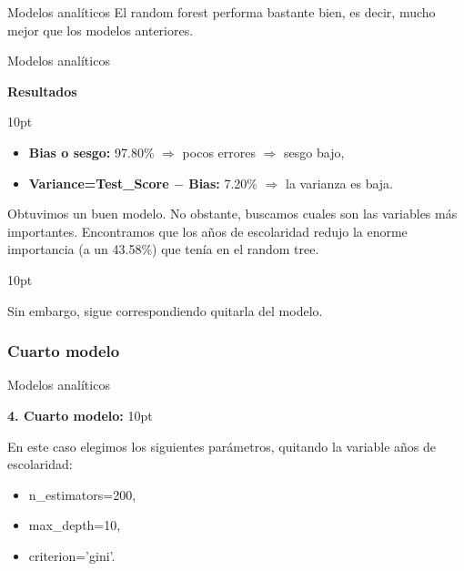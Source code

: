 \documentclass[pdf]{beamer}
\def\vspace{}%
\begin{document}
{\begin{frame}{Modelos analíticos}
    El random forest performa bastante bien, es decir, mucho mejor que los modelos anteriores.

\end{frame}

\begin{frame}{Modelos analíticos}

    \begin{Large}
        \textbf{Resultados}
    \end{Large}
    \vspace{10pt}    
    
    \begin{itemize}
        \item \textbf{Bias o sesgo:} 97.80\% $\Rightarrow$ pocos errores $\Rightarrow$ sesgo bajo,
        \item \textbf{Variance=Test\_Score $-$ Bias:} 7.20\% $\Rightarrow$ la varianza es baja.
    \end{itemize}
    
    Obtuvimos un buen modelo. No obstante, buscamos cuales son las variables más importantes. Encontramos que los años de escolaridad redujo la enorme importancia (a un 43.58\%) que tenía en el random tree. 
    
    \vspace{10pt}
    
    Sin embargo, sigue correspondiendo quitarla del modelo.

\end{frame}

\subsubsection{Cuarto modelo}

\begin{frame}{Modelos analíticos}

    \textbf{4. Cuarto modelo:}
    \vspace{10pt}

    En este caso elegimos los siguientes parámetros, quitando la variable años de escolaridad:
    \begin{itemize}
        \item n\_estimators=200,
        \item max\_depth=10,
        \item criterion='gini'.
    \end{itemize}
    

\end{frame}}
\end{document}
